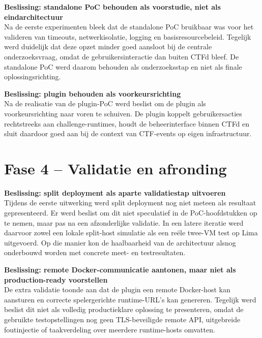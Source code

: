 \documentclass[dutch,dit,thesis]{hogentreport}
\begin{document}
\textbf{Beslissing: standalone PoC behouden als voorstudie, niet als eindarchitectuur}\\
Na de eerste experimenten bleek dat de standalone PoC bruikbaar was voor het valideren van timeouts, netwerkisolatie, logging en basisresourcebeleid. Tegelijk werd duidelijk dat deze opzet minder goed aansloot bij de centrale onderzoeksvraag, omdat de gebruikersinteractie dan buiten CTFd bleef. De standalone PoC werd daarom behouden als onderzoeksstap en niet als finale oplossingsrichting.

\textbf{Beslissing: plugin behouden als voorkeursrichting}\\
Na de realisatie van de plugin-PoC werd beslist om de plugin als voorkeursrichting naar voren te schuiven. De plugin koppelt gebruikersacties rechtstreeks aan challenge-runtimes, houdt de beheerinterface binnen CTFd en sluit daardoor goed aan bij de context van CTF-events op eigen infrastructuur.

\section*{Fase 4 -- Validatie en afronding}

\textbf{Beslissing: split deployment als aparte validatiestap uitvoeren}\\
Tijdens de eerste uitwerking werd split deployment nog niet meteen als resultaat gepresenteerd. Er werd beslist om dit niet speculatief in de PoC-hoofdstukken op te nemen, maar pas na een afzonderlijke validatie. In een latere iteratie werd daarvoor zowel een lokale split-host simulatie als een re\"ele twee-VM test op Lima uitgevoerd. Op die manier kon de haalbaarheid van de architectuur alsnog onderbouwd worden met concrete meet- en testresultaten.

\textbf{Beslissing: remote Docker-communicatie aantonen, maar niet als production-ready voorstellen}\\
De extra validatie toonde aan dat de plugin een remote Docker-host kan aansturen en correcte spelergerichte runtime-URL's kan genereren. Tegelijk werd beslist dit niet als volledig productieklare oplossing te presenteren, omdat de gebruikte testopstellingen nog geen TLS-beveiligde remote API, uitgebreide foutinjectie of taakverdeling over meerdere runtime-hosts omvatten.


\backmatter{}

\setlength\bibitemsep{2pt} %
\printbibliography[heading=bibintoc]
\end{document}
